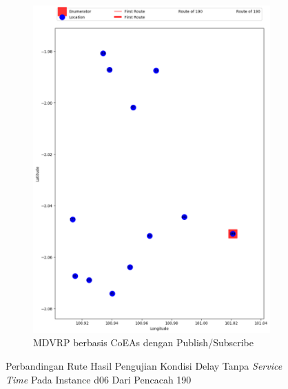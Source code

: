 \begin{figure}[H]\ContinuedFloat
	\centering
	\begin{subfigure}[t]{\textwidth}
		\centering
		\includegraphics[width=\textwidth]{Resources/Images/delayed_6/real_m15_n100_delayed_6_190_pubsub_coes}
		\caption{MDVRP berbasis CoEAs dengan Publish/Subscribe}
		\label{fig:real_m15_n100_delayed_6_190_pubsub_coes}
	\end{subfigure}
	\caption{Perbandingan Rute Hasil Pengujian Kondisi Delay Tanpa \textit{Service Time} Pada Instance d06 Dari Pencacah 190}
	\label{fig:real_m15_n100_delayed_6_190_contd}
\end{figure}


